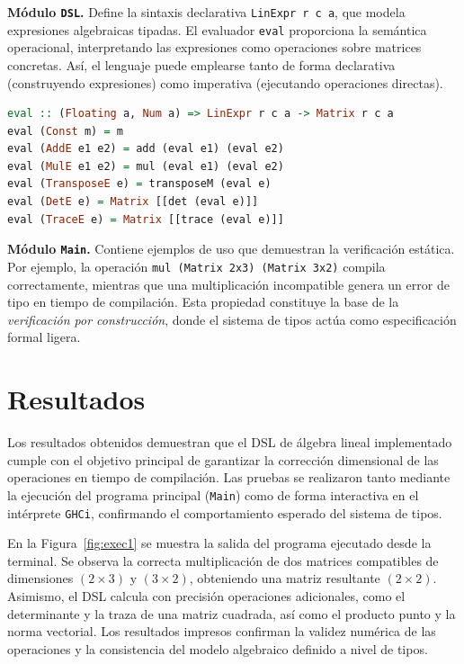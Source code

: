 \documentclass[conference]{IEEEtran}
\begin{document}
\textbf{Módulo \texttt{DSL}.} Define la sintaxis declarativa \texttt{LinExpr r c a}, que modela expresiones algebraicas tipadas. El evaluador \texttt{eval} proporciona la semántica operacional, interpretando las expresiones como operaciones sobre matrices concretas. Así, el lenguaje puede emplearse tanto de forma declarativa (construyendo expresiones) como imperativa (ejecutando operaciones directas).

\begin{lstlisting}[language=Haskell, caption={Evaluador \texttt{eval} que interpreta expresiones algebraicas tipadas.}, label={lst:eval}]
eval :: (Floating a, Num a) => LinExpr r c a -> Matrix r c a
eval (Const m) = m
eval (AddE e1 e2) = add (eval e1) (eval e2)
eval (MulE e1 e2) = mul (eval e1) (eval e2)
eval (TransposeE e) = transposeM (eval e)
eval (DetE e) = Matrix [[det (eval e)]]
eval (TraceE e) = Matrix [[trace (eval e)]]
\end{lstlisting}

\textbf{Módulo \texttt{Main}.} Contiene ejemplos de uso que demuestran la verificación estática. Por ejemplo, la operación \texttt{mul (Matrix 2x3) (Matrix 3x2)} compila correctamente, mientras que una multiplicación incompatible genera un error de tipo en tiempo de compilación. Esta propiedad constituye la base de la \textit{verificación por construcción}, donde el sistema de tipos actúa como especificación formal ligera.

\section{Resultados}

Los resultados obtenidos demuestran que el DSL de álgebra lineal implementado cumple con el objetivo principal de garantizar la corrección dimensional de las operaciones en tiempo de compilación. Las pruebas se realizaron tanto mediante la ejecución del programa principal (\texttt{Main}) como de forma interactiva en el intérprete \texttt{GHCi}, confirmando el comportamiento esperado del sistema de tipos.

En la Figura~\ref{fig:exec1} se muestra la salida del programa ejecutado desde la terminal. Se observa la correcta multiplicación de dos matrices compatibles de dimensiones $(2\times3)$ y $(3\times2)$, obteniendo una matriz resultante $(2\times2)$. Asimismo, el DSL calcula con precisión operaciones adicionales, como el determinante y la traza de una matriz cuadrada, así como el producto punto y la norma vectorial. Los resultados impresos confirman la validez numérica de las operaciones y la consistencia del modelo algebraico definido a nivel de tipos.
\end{document}
